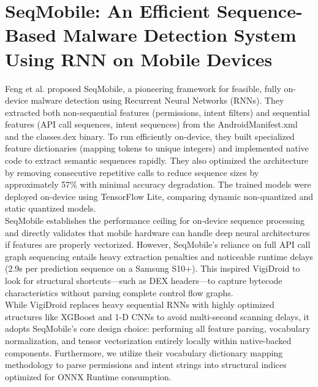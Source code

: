  \section{SeqMobile: An Efficient Sequence-Based Malware Detection System Using RNN on Mobile Devices}
 Feng et al.\cite{seqmobile} proposed SeqMobile, a pioneering framework for feasible, fully on-device malware detection using Recurrent Neural Networks (RNNs). They extracted both non-sequential features (permissions, intent filters) and sequential features (API call sequences, intent sequences) from the AndroidManifest.xml and the classes.dex binary. To run efficiently on-device, they built specialized feature dictionaries (mapping tokens to unique integers) and implemented native code to extract semantic sequences rapidly. They also optimized the architecture by removing consecutive repetitive calls to reduce sequence sizes by approximately 57\% with minimal accuracy degradation. The trained models were deployed on-device using TensorFlow Lite, comparing dynamic non-quantized and static quantized models.\\
SeqMobile establishes the performance ceiling for on-device sequence processing and directly validates that mobile hardware can handle deep neural architectures if features are properly vectorized. However, SeqMobile's reliance on full API call graph sequencing entails heavy extraction penalties and noticeable runtime delays (2.9s per prediction sequence on a Samsung S10+). This inspired VigiDroid to look for structural shortcuts—such as DEX headers—to capture bytecode characteristics without parsing complete control flow graphs.\\
While VigiDroid replaces heavy sequential RNNs with highly optimized structures like XGBoost and 1-D CNNs to avoid multi-second scanning delays, it adopts SeqMobile's core design choice: performing all feature parsing, vocabulary normalization, and tensor vectorization entirely locally within native-backed components. Furthermore, we utilize their vocabulary dictionary mapping methodology to parse permissions and intent strings into structural indices optimized for ONNX Runtime consumption.

